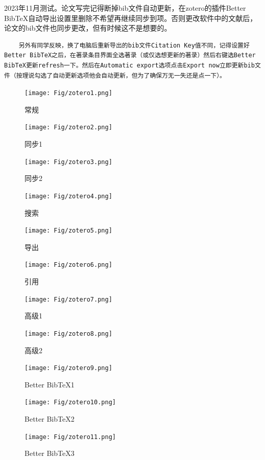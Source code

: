 2023年11月测试。论文写完记得断掉bib文件自动更新，在zotero的插件Better BibTeX自动导出设置里删除不希望再继续同步到项。否则更改软件中的文献后，论文的bib文件也同步更改，但有时候这不是想要的。
\begin{lstlisting}
    另外有同学反映，换了电脑后重新导出的bib文件Citation Key值不同，记得设置好Better BibTeX之后，在著录条目界面全选著录（或仅选想更新的著录）然后右键选Better BibTeX更新refresh一下。然后在Automatic export选项点击Export now立即更新bib文件（按理说勾选了自动更新选项他会自动更新，但为了确保万无一失还是点一下）。
\end{lstlisting}
\begin{figure}
	\centering
	\texttt{[image: Fig/zotero1.png]}
	\caption{\label{op1}常规}
\end{figure}
\begin{figure}
	\centering
	\texttt{[image: Fig/zotero2.png]}
	\caption{\label{op2}同步1}
\end{figure}
\begin{figure}
	\centering
	\texttt{[image: Fig/zotero3.png]}
	\caption{\label{op3}同步2}
\end{figure}
\begin{figure}
	\centering
	\texttt{[image: Fig/zotero4.png]}
	\caption{\label{op4}搜索}
\end{figure}
\begin{figure}
	\centering
	\texttt{[image: Fig/zotero5.png]}
	\caption{\label{op5}导出}
\end{figure}
\begin{figure}
	\centering
	\texttt{[image: Fig/zotero6.png]}
	\caption{\label{op6}引用}
\end{figure}
\begin{figure}
	\centering
	\texttt{[image: Fig/zotero7.png]}
	\caption{\label{op7}高级1}
\end{figure}
\begin{figure}
	\centering
	\texttt{[image: Fig/zotero8.png]}
	\caption{\label{op8}高级2}
\end{figure}
\begin{figure}
	\centering
	\texttt{[image: Fig/zotero9.png]}
	\caption{\label{op9}Better BibTeX1}
\end{figure}
\begin{figure}
	\centering
	\texttt{[image: Fig/zotero10.png]}
	\caption{\label{op10}Better BibTeX2}
\end{figure}
\begin{figure}
	\centering
	\texttt{[image: Fig/zotero11.png]}
	\caption{\label{op11}Better BibTeX3}
\end{figure}

